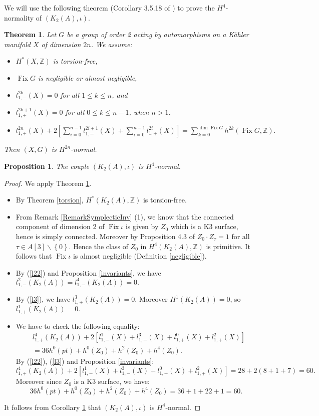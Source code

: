 \documentclass{alggeom}
\DeclareMathOperator{\Fix}{Fix}
\newcommand{\Z}{\mathbb{Z}}
\theoremstyle{plain}
\newtheorem{thm}[theorem]{Theorem}
\newtheorem{prop}[theorem]{Proposition}
\theoremstyle{definition}
\theoremstyle{remark}
\begin{document}
We will use the following theorem (Corollary 3.5.18 of \cite{Lol}) to prove the $H^4$-normality of $(K_{2}(A),\iota)$.
\begin{thm}\label{utile'}
Let $G$ be a group of order 2 acting by automorphisms on a K\"ahler manifold $X$ of dimension $2n$. 
We assume:
\begin{itemize}
\item[i)]
$H^{*}(X,\Z)$ is torsion-free,
\item[ii)]
$\Fix G$ is negligible or almost negligible,
\item[iii)]
$l_{1,-}^{2k}(X)=0$ for all $1\leq k \leq n$, and
\item[iv)]
$l_{1,+}^{2k+1}(X)=0$ for all $0\leq k \leq n-1$, when $n>1$.
\item[v)]

$l_{1,+}^{2n}(X)+2\left[\sum_{i=0}^{n-1}l_{1,-}^{2i+1}(X)+\sum_{i=0}^{n-1}l_{1,+}^{2i}(X)\right]
= \sum_{k=0}^{\dim \Fix G}h^{2k}(\Fix G,\Z).$

\end{itemize}
Then $(X,G)$ is $H^{2n}$-normal.
\end{thm}
\begin{prop}\label{H4norm}
The couple $(K_{2}(A),\iota)$ is $H^{4}$-normal.
\end{prop}
\begin{proof}
We apply Theorem \ref{utile'}.
\begin{itemize}
\item[i)]
By Theorem \ref{torsion}, $H^{*}(K_{2}(A),\Z)$ is torsion-free. 
\item[ii)]
From Remark \ref{RemarkSymplecticInv} (1), we know that the connected component of dimension 2 of $\Fix \iota$  is given by $Z_{0}$ which is a K3 surface, hence is simply connected. 
Moreover by Proposition 4.3 of \cite{Hassett} $Z_{0}\cdot Z_{\tau}=1$ for all $\tau\in A[3]\smallsetminus \left\{0\right\}$. Hence the class of $Z_{0}$ in $H^{4}(K_{2}(A),\Z)$ is primitive. It follows that $\Fix \iota$ is almost negligible (Definition \ref{negligible}). 
\item[iii)]
By (\ref{l22}) and Proposition \ref{invariants}, we have $l_{1,-}^{2}(K_{2}(A))=l_{1,-}^{4}(K_{2}(A))=0.$
\item[iv)]
By (\ref{l3}), we have $l_{1,+}^{3}(K_{2}(A))=0.$ Moreover $H^{1}(K_{2}(A))=0$, so $l_{1,+}^{1}(K_{2}(A))=0.$
\item[v)]
We have to check the following equality:
\begin{align*}
&l_{1,+}^{4}(K_{2}(A))+2\left[l_{1,-}^{1}(X)+l_{1,-}^{3}(X)+l_{1,+}^{0}(X)+l_{1,+}^{2}(X)\right]\\
&= 36h^{0}(pt)+h^{0}(Z_{0})+h^{2}(Z_{0})+h^{4}(Z_{0}).
\end{align*}
By (\ref{l22}), (\ref{l3}) and Proposition \ref{invariants}:
$$l_{1,+}^{4}(K_{2}(A))+2\left[l_{1,-}^{1}(X)+l_{1,-}^{3}(X)+l_{1,+}^{0}(X)+l_{1,+}^{2}(X)\right]=28+2(8+1+7)=60.$$
Moreover since $Z_{0}$ is a K3 surface, we have:
$$36h^{0}(pt)+h^{0}(Z_{0})+h^{2}(Z_{0})+h^{4}(Z_{0})=36+1+22+1=60.$$
\end{itemize}
It follows from Corollary \ref{utile'} that $(K_{2}(A),\iota)$ is $H^4$-normal.
\end{proof} 
\end{document}
